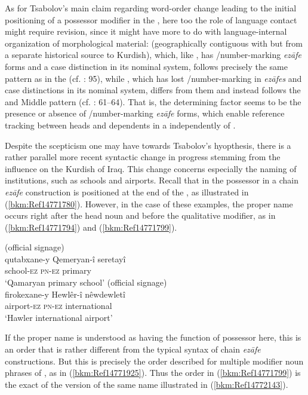\documentclass[output=paper]{langsci/langscibook}
\begin{document}
As for Tsabolov’s main claim regarding word-order change leading to the initial positioning of a possessor modifier in the , here too the role of language contact might require revision, since it might have more to do with language-internal organization of morphological material:  (geographically contiguous with  but from a separate historical source to Kurdish), which, like , has /number-marking \textit{ezāfe} forms and a case distinction in its nominal system, follows precisely the same  pattern as  in the  (cf. \citealt{Todd2002}: 95), while , which has lost /number-marking in \textit{ezāfes} and case distinctions in its nominal system, differs from them and instead follows the  and Middle  pattern (cf. \citealt{Öpengin2016}: 61–64). That is, the determining factor seems to be the presence or absence of /number-marking \textit{ezāfe} forms, which enable reference tracking between heads and dependents in a  independently of .   

Despite the scepticism one may have towards Tsabolov’s hyopthesis, there is a rather parallel more recent syntactic change in progress stemming from the  influence on the Kurdish of Iraq. This change concerns especially the naming of institutions, such as schools and airports. Recall that in  the possessor in a chain \textit{ezāfe} construction is positioned at the end of the , as illustrated in (\ref{bkm:Ref14771780}). However, in the case of these examples, the proper name occurs right after the head noun and before the qualitative modifier, as in (\ref{bkm:Ref14771794}) and (\ref{bkm:Ref14771799}). 

\ea\label{bkm:Ref14771794} (official signage)\\
\gll qutabxane-y Qemeryan-î seretayî\\
     school-\textsc{ez} \textsc{pn-ez} primary\\
\glt ‘Qamaryan primary school’
\ex \label{bkm:Ref14771799} (official signage)\\
\gll firokexane-y Hewlêr-î nêwdewletî\\
     airport-\textsc{ez} \textsc{pn-ez} international\\
\glt ‘Hawler international airport’
\z

If the proper name is understood as having the function of possessor here, this is an order that is rather different from the typical  syntax of chain \textit{ezāfe} constructions. But this is precisely the order described for multiple modifier noun phrases of , as in (\ref{bkm:Ref14771925}). Thus the order in (\ref{bkm:Ref14771799}) is the exact  of the  version of the same name illustrated in (\ref{bkm:Ref14772143}).
\end{document}
